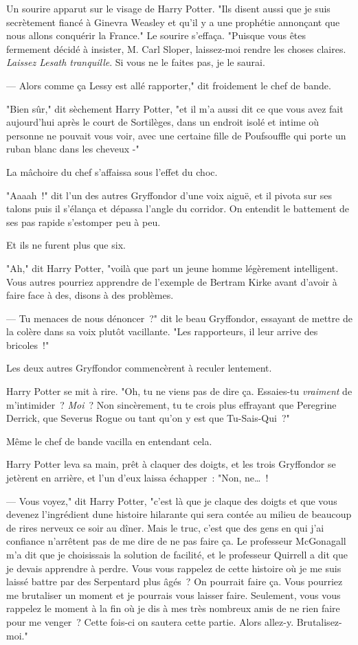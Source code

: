 Un sourire apparut sur le visage de Harry Potter. "Ils disent aussi que je suis secrètement fiancé à Ginevra Weasley et qu'il y a une prophétie annonçant que nous allons conquérir la France." Le sourire s'effaça. "Puisque vous êtes fermement décidé à insister, M. Carl Sloper, laissez-moi rendre les choses claires. \emph{Laissez Lesath tranquille}. Si vous ne le faites pas, je le saurai.

--- Alors comme ça Lessy est allé rapporter," dit froidement le chef de bande.

"Bien sûr," dit sèchement Harry Potter, "et il m'a aussi dit ce que vous avez fait aujourd'hui après le court de Sortilèges, dans un endroit isolé et intime où personne ne pouvait vous voir, avec une certaine fille de Poufsouffle qui porte un ruban blanc dans les cheveux -"

La mâchoire du chef s'affaissa sous l'effet du choc.

"Aaaah~!" dit l'un des autres Gryffondor d'une voix aiguë, et il pivota sur ses talons puis il s'élança et dépassa l'angle du corridor. On entendit le battement de ses pas rapide s'estomper peu à peu.

Et ils ne furent plus que six.

"Ah," dit Harry Potter, "voilà que part un jeune homme légèrement intelligent. Vous autres pourriez apprendre de l'exemple de Bertram Kirke avant d'avoir à faire face à des, disons à des problèmes.

--- Tu menaces de nous dénoncer~?" dit le beau Gryffondor, essayant de mettre de la colère dans sa voix plutôt vacillante. "Les rapporteurs, il leur arrive des bricoles~!"

Les deux autres Gryffondor commencèrent à reculer lentement.

Harry Potter se mit à rire. "Oh, tu ne viens pas de dire ça. Essaies-tu \emph{vraiment} de m'intimider~? \emph{Moi}~? Non sincèrement, tu te crois plus effrayant que Peregrine Derrick, que Severus Rogue ou tant qu'on y est que Tu-Sais-Qui~?"

Même le chef de bande vacilla en entendant cela.

Harry Potter leva sa main, prêt à claquer des doigts, et les trois Gryffondor se jetèrent en arrière, et l'un d'eux laissa échapper~: "Non, ne…~!

--- Vous voyez," dit Harry Potter, "c'est là que je claque des doigts et que vous devenez l'ingrédient dune histoire hilarante qui sera contée au milieu de beaucoup de rires nerveux ce soir au dîner. Mais le truc, c'est que des gens en qui j'ai confiance n'arrêtent pas de me dire de ne pas faire ça. Le professeur McGonagall m'a dit que je choisissais la solution de facilité, et le professeur Quirrell a dit que je devais apprendre à perdre. Vous vous rappelez de cette histoire où je me suis laissé battre par des Serpentard plus âgés~? On pourrait faire ça. Vous pourriez me brutaliser un moment et je pourrais vous laisser faire. Seulement, vous vous rappelez le moment à la fin où je dis à mes très nombreux amis de ne rien faire pour me venger~? Cette fois-ci on sautera cette partie. Alors allez-y. Brutalisez-moi."

